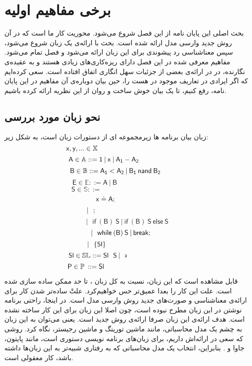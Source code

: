 
\chapter{برخی مفاهیم اولیه}
بحث اصلی این پایان نامه از این فصل شروع می‌شود. محوریت کار ما\cite{calcul} است که در آن روش جدید وارسی مدل ارائه شده است. بحث با ارائه‌ی یک زبان شروع می‌شود، سپس معناشناسی رد پیشوندی برای این زبان ارائه می‌شود و فصل تمام می‌شود. مفاهیم معرفی شده در این فصل دارای ریزه‌کاری‌های زیادی هستند و به عقیده‌ی نگارنده، در \cite{calcul} در ارائه‌ی بعضی از جزئیات سهل انگاری اتفاق افتاده است. سعی کرده‌ایم که اگر ایرادی در تعاریف موجود در \cite{calcul} هست را، حین بیان دوباره‌ی آن مفاهیم در این پایان نامه، رفع کنیم، تا یک بیان خوش ساخت و روان از این نظریه ارائه کرده باشیم.

\section{نحو زبان مورد بررسی‬}
زبان بیان برنامه ها زیرمجموعه ای از دستورات زبان  است، به شکل زیر:
$$\mathsf{x,y},... \in \mathbb{X}\hspace{4.65cm}$$
$$\mathsf{A} \in \mathbb{A} ::=\mathsf{1\:|\:x\:|\:A_1 - A_2\hspace{2.4cm}}$$  
$$\mathsf{B \in \mathbb{B} ::=A_1<A_2 \:|\: B_1 \: nand\: B_2\hspace{1.2cm}}$$
$$\mathsf{E \in \mathbb{E}::= A \: | \: B\hspace{4cm}}$$
$$\mathsf{S\in \mathbb{S} ::=\hspace{5cm}  }$$
$$\mathsf{x\doteq A; \hspace{2.25cm}}$$
$$\mathsf{|\:\:\:;\hspace{3.75cm}}$$
$$\mathsf{|\:\:\:if\:(B)\:S\:|\:if\:(B)\:S\:else\:S}$$
$$\mathsf{|\:\:\:while\:(B)\:S\: | \: break;\hspace{0.65cm}}$$
$$\mathsf{|\:\:\:\{Sl\}\hspace{3.15cm}}$$
$$\mathsf{Sl \in \mathbb{SL}::=Sl\:\:\:S\:|\:\backepsilon}\hspace{3.05cm}$$
$$\mathsf{P\in \mathbb{P}\:::=Sl}\hspace{4.25cm}$$

\vspace{1cm}
قابل مشاهده است که این زبان، نسبت به کل زبان ، تا حد ممکن ساده سازی شده است. علت این کار را بعدا عمیق‌تر حس خواهیم‌کرد. علتْ ساده‌تر شدن کار برای ارائه‌ی معناشناسی و صورت‌های جدید روش وارسی مدل است. در اینجا، راحتی برنامه نوشتن در این زبان مطرح نبوده است، چون اصلا این زبان برای این کار ساخته نشده است. هدف ارائه‌ی این زبان صرفا ارائه‌ی روش جدید است. یعنی می‌توان به این زبان به چشم یک مدل محاسباتی، مانند ماشین تورینگ و ماشین رجیستر، نگاه کرد. روشی که سعی در ارائه‌اش داریم، برای زبان‌های برنامه نویسی دستوری است، مانند پایتون، جاوا و . بنابراین، انتخاب یک مدل محاسباتی که به رفتاری شبیه‌تر به این زبان‌ها داشته باشد، کار معقولی است.


